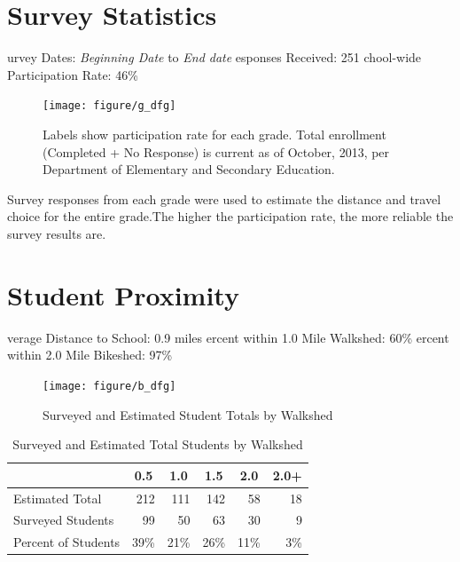 \documentclass[12pt,letterpaper]{report}\usepackage{graphicx, color}
\newenvironment{knitrout}{}{} %
\newcommand{\factoid}[1]{\flushleft{\large{#1}}}
\begin{document}
\section*{Survey Statistics}
{\factoid Survey Dates: \emph{Beginning Date} to \emph{End date}}
{\factoid Responses Received: 251}
{\factoid School-wide Participation Rate: 46\%}

\begin{knitrout}
\color{fgcolor}\begin{figure}[H]


{\centering \texttt{[image: figure/g\_dfg]} 

}

\caption[Labels show participation rate for each grade]{Labels show participation rate for each grade. Total enrollment (Completed + No Response) is current as of October, 2013, per Department of Elementary and Secondary Education.\label{fig:g_dfg}}
\end{figure}


\end{knitrout}


Survey responses from each grade were used to estimate the distance and travel choice for the entire grade.The higher the participation rate, the more reliable the survey results are.

\newpage
\section*{Student Proximity}
{\factoid Average Distance to School: 0.9 miles}
{\factoid Percent within 1.0 Mile Walkshed: 60\%}
{\factoid Percent within 2.0 Mile Bikeshed: 97\%}
\begin{figure}[H]


{\centering \texttt{[image: figure/b\_dfg]} 

}

\caption[Surveyed and Estimated Student Totals by Walkshed]{Surveyed and Estimated Student Totals by Walkshed\label{fig:b_dfg}}
\end{figure}




%
\begin{table}[H]
\caption{Surveyed and Estimated Total Students by Walkshed\label{b}} 
\begin{center}
\begin{tabular}{lrrrrr}
\hline
\multicolumn{1}{c}{}&\multicolumn{1}{c}{0.5}&\multicolumn{1}{c}{1.0}&\multicolumn{1}{c}{1.5}&\multicolumn{1}{c}{2.0}&\multicolumn{1}{c}{2.0+}\tabularnewline
\hline
Estimated Total&212&111&142&58&18\tabularnewline
Surveyed Students&99&50&63&30&9\tabularnewline
Percent of Students&39\%&21\%&26\%&11\%&3\%\tabularnewline
\hline
\end{tabular}
\end{center}
\end{table}
\end{document}
